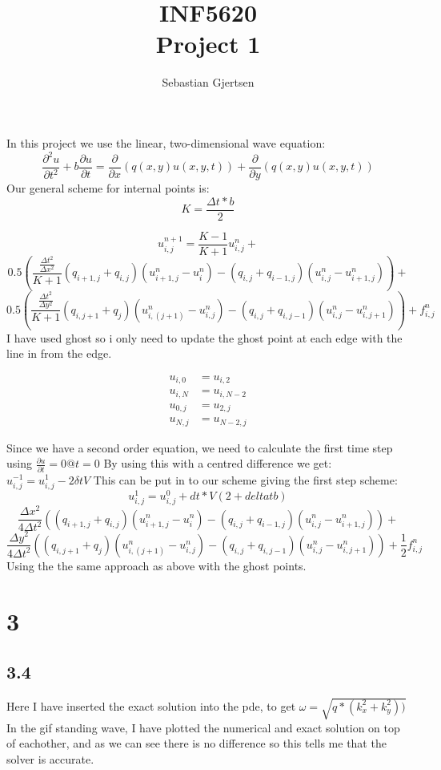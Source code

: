\documentclass[a4paper,norsk]{article}
\begin{document}
\title{INF5620 \\ Project 1}
\author{Sebastian Gjertsen}

\maketitle
\section*{}
In this project we use the linear, two-dimensional wave equation:
$$\frac{\partial^2 u}{\partial t^2} + b \frac{\partial u}{\partial t} = \frac{\partial }{\partial x}(q(x,y)u(x,y,t)) + \frac{\partial }{\partial y}(q(x,y)u(x,y,t))  $$
Our general scheme for internal points is:
$$K = \frac{\Delta t*b}{2}$$

$$u_{i,j}^{n+1} = \frac{K-1}{K+1}u_{i,j}^n + $$
$$0.5(\frac{\frac{\Delta t^2}{\Delta x^2}}{K+1}(q_{i+1,j}+q_{i,j})(u_{i+1,j}^n-u_i^n) - (q_{i,j}+q_{i-1,j})(u_{i,j}^n - u_{i+1,j}^n)) + $$ 
$$0.5(\frac{\frac{\Delta t^2}{\Delta y^2}}{K+1}(q_{i,j+1}+q_{j})(u_{i,(j+1)}^n-u_{i,j}^n) - (q_{i,j}+q_{i,j-1})(u_{i,j}^n - u_{i,j+1}^n)) +f_{i,j}^n $$
I have used ghost so i only need to update the ghost point at each edge with the line in from the edge.

\begin{align*}
u_{i,0} &= u_{i,2} \\
u_{i,N} &= u_{i,N-2} \\
u_{0,j} &= u_{2,j} \\
u_{N,j} &= u_{N-2,j}    
\end{align*}


Since we have a second order equation, we need to calculate the first time step using $ \frac{\partial u}{\partial t} = 0 @ t = 0 $
By using this with a centred difference we get: $ u_{i,j}^{-1} = u_{i,j}^1 - 2 \delta tV   $
This can be put in to our scheme giving the first step scheme:
$$u_{i,j}^{1} =  u_{i,j}^0 + dt*V(2+ delta tb) $$
$$\frac{\Delta x^2}{4 \Delta t^2 }((q_{i+1,j}+q_{i,j})(u_{i+1,j}^n-u_i^n) - (q_{i,j}+q_{i-1,j})(u_{i,j}^n - u_{i+1,j}^n)) + $$ 
$$\frac{\Delta y^2}{4 \Delta t^2 }((q_{i,j+1}+q_{j})(u_{i,(j+1)}^n-u_{i,j}^n) - (q_{i,j}+q_{i,j-1})(u_{i,j}^n - u_{i,j+1}^n)) +\frac{1}{2}f_{i,j}^n $$
Using the the same approach as above with the ghost points.


\section*{3}
\subsection*{3.4}
Here I have inserted the exact solution into the pde, to get $\omega = \sqrt{q*(k_x^2+k_y^2))}$
In the gif standing wave, I have plotted the numerical and exact solution on top of eachother, and as we can see there is no difference so this tells me that the solver is accurate.
\end{document}
